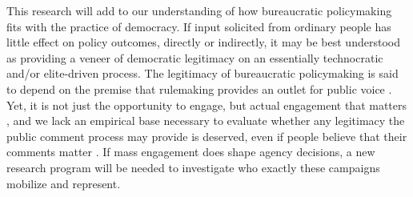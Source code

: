 

This research will add to our understanding of how  bureaucratic policymaking fits with the practice of democracy.
If input solicited from ordinary people has little effect on policy outcomes, directly or indirectly, it may be best understood as providing a veneer of democratic legitimacy on an essentially technocratic and/or elite-driven process.
The legitimacy of bureaucratic policymaking is said to depend on the premise that rulemaking provides an outlet for public voice \citep{Croley2003, Rosenbloom2003}. Yet, it is not just the opportunity to engage, but actual engagement that matters \citep{Herz2018}, and we lack an empirical base necessary to evaluate whether any legitimacy the public comment process may provide is deserved, even if people believe that their comments matter \citep{Yackee2014JPART}.
If mass engagement does shape agency decisions, a new research program will be needed to investigate who exactly these campaigns mobilize and represent.

